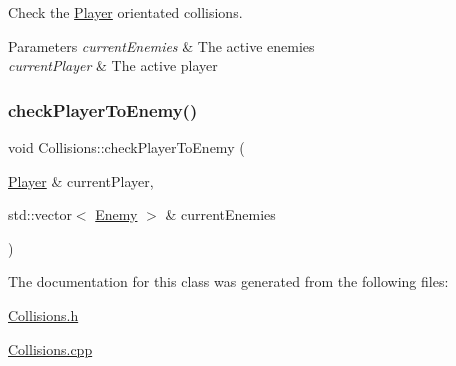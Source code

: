 Check the \hyperlink{class_player}{Player} orientated collisions. 


\begin{DoxyParams}{Parameters}
{\em current\+Enemies} & The active enemies \\
\hline
{\em current\+Player} & The active player \\
\hline
\end{DoxyParams}
\mbox{\label{class_collisions_a5c4cd9f8f690d0ba92fe5aabfb8d88fa}} 
\subsubsection{\texorpdfstring{check\+Player\+To\+Enemy()}{checkPlayerToEnemy()}}
{\footnotesize\ttfamily void Collisions\+::check\+Player\+To\+Enemy (\begin{DoxyParamCaption}\item[{\hyperlink{class_player}{Player} \&}]{current\+Player,  }\item[{std\+::vector$<$ \hyperlink{class_enemy}{Enemy} $>$ \&}]{current\+Enemies }\end{DoxyParamCaption})\hspace{0.3cm}{\ttfamily [private]}}



The documentation for this class was generated from the following files\+:\begin{DoxyCompactItemize}
\item 
\hyperlink{_collisions_8h}{Collisions.\+h}\item 
\hyperlink{_collisions_8cpp}{Collisions.\+cpp}\end{DoxyCompactItemize}
